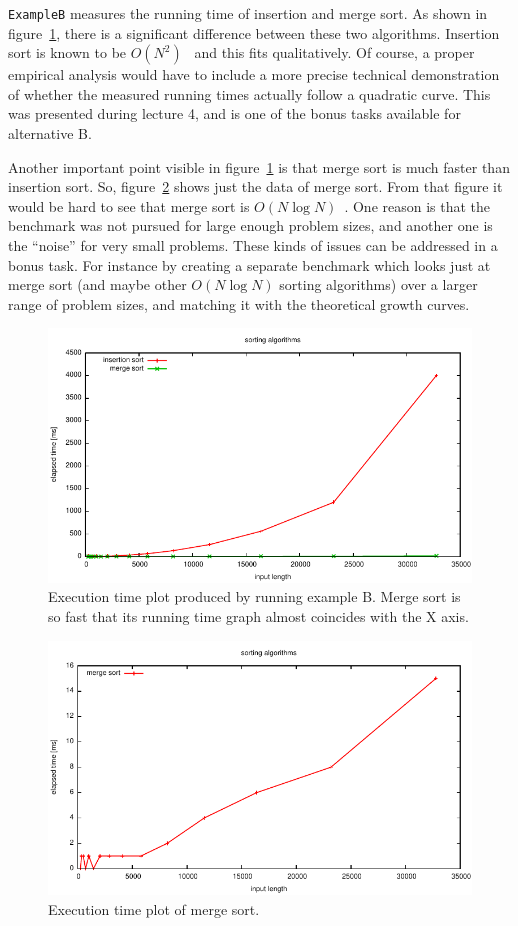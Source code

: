 \documentclass[a4paper,10pt]{article}
\begin{document}
\texttt{ExampleB} measures the running time of insertion and merge sort.
As shown in figure~\ref{fig:exb-plot}, there is a significant difference between these two algorithms.
Insertion sort is known to be $O(N^2)$~\cite{wikipedia:insertion-sort} and this fits qualitatively.
Of course, a proper empirical analysis would have to include a more precise technical demonstration of whether the measured running times actually follow a quadratic curve.
This was presented during lecture 4, and is one of the bonus tasks available for alternative B.

Another important point visible in figure~\ref{fig:exb-plot} is that merge sort is much faster than insertion sort.
So, figure~\ref{fig:exb-merge-plot} shows just the data of merge sort.
From that figure it would be hard to see that merge sort is $O(N\log N)$~\cite{wikipedia:merge-sort}.
One reason is that the benchmark was not pursued for large enough problem sizes, and another one is the ``noise'' for very small problems.
These kinds of issues can be addressed in a bonus task.
For instance by creating a separate benchmark which looks just at merge sort (and maybe other $O(N\log N)$ sorting algorithms) over a larger range of problem sizes, and matching it with the theoretical growth curves.

\begin{figure}
  \centering
  \includegraphics[width=0.8\columnwidth]{plot-ExampleB-all.pdf}
  \caption{
    Execution time plot produced by running example B.
    Merge sort is so fast that its running time graph almost coincides with the X axis.
  }\label{fig:exb-plot}
\end{figure}

\begin{figure}
  \centering
  \includegraphics[width=0.8\columnwidth]{plot-ExampleB-zoom.pdf}
  \caption{
    Execution time plot of merge sort.
  }\label{fig:exb-merge-plot}
\end{figure}
\end{document}
